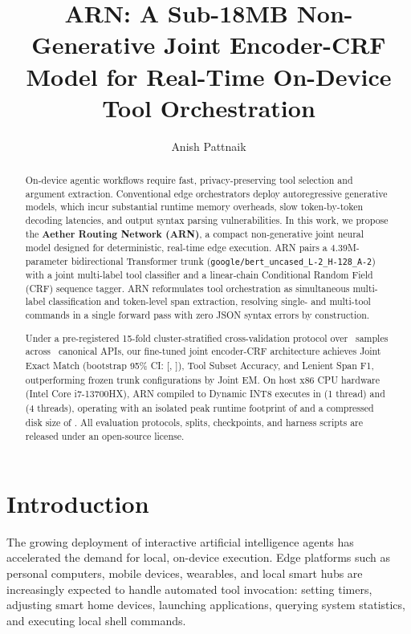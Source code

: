 \documentclass[letterpaper]{article}
\title{ARN: A Sub-18MB Non-Generative Joint Encoder-CRF Model for Real-Time On-Device Tool Orchestration}
\author{
    Anish Pattnaik
}
\begin{document}
\maketitle

\begin{abstract}
On-device agentic workflows require fast, privacy-preserving tool selection and argument extraction. Conventional edge orchestrators deploy autoregressive generative models, which incur substantial runtime memory overheads, slow token-by-token decoding latencies, and output syntax parsing vulnerabilities. In this work, we propose the \textbf{Aether Routing Network (ARN)}, a compact non-generative joint neural model designed for deterministic, real-time edge execution. ARN pairs a 4.39M-parameter bidirectional Transformer trunk (\texttt{google/bert\_uncased\_L-2\_H-128\_A-2}) with a joint multi-label tool classifier and a linear-chain Conditional Random Field (CRF) sequence tagger. ARN reformulates tool orchestration as simultaneous multi-label classification and token-level span extraction, resolving single- and multi-tool commands in a single forward pass with zero JSON syntax errors by construction. 

Under a pre-registered 15-fold cluster-stratified cross-validation protocol over \TotalDatasetSamples\ samples across \TotalCandidateTools\ canonical APIs, our fine-tuned joint encoder-CRF architecture achieves \textbf{\PrimaryJointEM} Joint Exact Match (bootstrap 95\% CI: [\PrimaryJointEMCILow, \PrimaryJointEMCIHigh]), \textbf{\PrimaryToolAcc} Tool Subset Accuracy, and \textbf{\PrimaryLenientFOne} Lenient Span F1, outperforming frozen trunk configurations by \textbf{\FineTuningJointEMDelta} Joint EM. On host x86 CPU hardware (Intel Core i7-13700HX), ARN compiled to Dynamic INT8 executes in \textbf{\ONNXINTOnetTLatencyMean} (1 thread) and \textbf{\ONNXINTFourTLatencyMean} (4 threads), operating with an isolated peak runtime footprint of \textbf{\IsolatedPeakRSS} and a compressed disk size of \textbf{\ModelSizeONNXINT}. All evaluation protocols, splits, checkpoints, and harness scripts are released under an open-source license.
\end{abstract}

\section{Introduction}

The growing deployment of interactive artificial intelligence agents has accelerated the demand for local, on-device execution. Edge platforms such as personal computers, mobile devices, wearables, and local smart hubs are increasingly expected to handle automated tool invocation: setting timers, adjusting smart home devices, launching applications, querying system statistics, and executing local shell commands.
\end{document}
